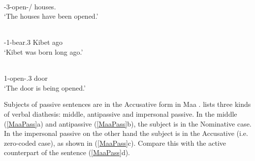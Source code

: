 \begin{exe}\ex\label{NanPass}
\begin{xlist}\ex\gll{} \textbf{}\\
\pst{}-3-open-\stat{}/\pass{} houses.\nom{}\\
\glt `The houses have been opened.'%

\ex\gll{}   \\
\pst{}-1\pl{}-bear.3 Kibet ago\\
\glt `Kibet was born long ago.'

\ex\gll{} \\
1\pl{}-open-\ipfv{}.3 door\\
\glt `The door is being opened.' 
\end{xlist}%
\end{exe}


Subjects of passive sentences are in the Accusative form in Maa .
\citet{Payne:2007} lists three kinds of verbal diathesis: middle, antipassive and impersonal passive.
In the middle (\ref{MaaPass}a) and antipassive (\ref{MaaPass}b), the subject is in the Nominative  case. 
In the impersonal passive on the other hand the subject is in the Accusative (i.e. zero-coded case), as shown in (\ref{MaaPass}c). 
Compare this with the active counterpart of the sentence (\ref{MaaPass}d).

